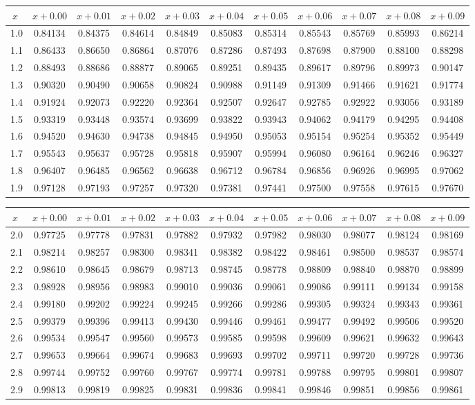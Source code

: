 \documentclass{article}
\begin{document}
{\myskip
\begin{tabular}{|c|c|c|c|c|c|c|c|c|c|c|}
\hline
$x\;$&$x\!+\!0.00$&$x\!+\!0.01$&$x\!+\!0.02$&$x\!+\!0.03$&$x\!+\!0.04$&$x\!+\!0.05$&$x\!+\!0.06$&$x\!+\!0.07$&$x\!+\!0.08$&$x\!+\!0.09$\\\hline
1.0&0.84134&0.84375&0.84614&0.84849&0.85083&0.85314&0.85543&0.85769&0.85993&0.86214\\
1.1&0.86433&0.86650&0.86864&0.87076&0.87286&0.87493&0.87698&0.87900&0.88100&0.88298\\
1.2&0.88493&0.88686&0.88877&0.89065&0.89251&0.89435&0.89617&0.89796&0.89973&0.90147\\
1.3&0.90320&0.90490&0.90658&0.90824&0.90988&0.91149&0.91309&0.91466&0.91621&0.91774\\
1.4&0.91924&0.92073&0.92220&0.92364&0.92507&0.92647&0.92785&0.92922&0.93056&0.93189\\
1.5&0.93319&0.93448&0.93574&0.93699&0.93822&0.93943&0.94062&0.94179&0.94295&0.94408\\
1.6&0.94520&0.94630&0.94738&0.94845&0.94950&0.95053&0.95154&0.95254&0.95352&0.95449\\
1.7&0.95543&0.95637&0.95728&0.95818&0.95907&0.95994&0.96080&0.96164&0.96246&0.96327\\
1.8&0.96407&0.96485&0.96562&0.96638&0.96712&0.96784&0.96856&0.96926&0.96995&0.97062\\
1.9&0.97128&0.97193&0.97257&0.97320&0.97381&0.97441&0.97500&0.97558&0.97615&0.97670\\
\hline
\end{tabular}

\myskip
\begin{tabular}{|c|c|c|c|c|c|c|c|c|c|c|}
\hline
$x\;$&$x\!+\!0.00$&$x\!+\!0.01$&$x\!+\!0.02$&$x\!+\!0.03$&$x\!+\!0.04$&$x\!+\!0.05$&$x\!+\!0.06$&$x\!+\!0.07$&$x\!+\!0.08$&$x\!+\!0.09$\\\hline
2.0&0.97725&0.97778&0.97831&0.97882&0.97932&0.97982&0.98030&0.98077&0.98124&0.98169\\
2.1&0.98214&0.98257&0.98300&0.98341&0.98382&0.98422&0.98461&0.98500&0.98537&0.98574\\
2.2&0.98610&0.98645&0.98679&0.98713&0.98745&0.98778&0.98809&0.98840&0.98870&0.98899\\
2.3&0.98928&0.98956&0.98983&0.99010&0.99036&0.99061&0.99086&0.99111&0.99134&0.99158\\
2.4&0.99180&0.99202&0.99224&0.99245&0.99266&0.99286&0.99305&0.99324&0.99343&0.99361\\
2.5&0.99379&0.99396&0.99413&0.99430&0.99446&0.99461&0.99477&0.99492&0.99506&0.99520\\
2.6&0.99534&0.99547&0.99560&0.99573&0.99585&0.99598&0.99609&0.99621&0.99632&0.99643\\
2.7&0.99653&0.99664&0.99674&0.99683&0.99693&0.99702&0.99711&0.99720&0.99728&0.99736\\
2.8&0.99744&0.99752&0.99760&0.99767&0.99774&0.99781&0.99788&0.99795&0.99801&0.99807\\
2.9&0.99813&0.99819&0.99825&0.99831&0.99836&0.99841&0.99846&0.99851&0.99856&0.99861\\
\hline
\end{tabular}

\myskip
}%

\label{LastPageNo}
\end{document}
